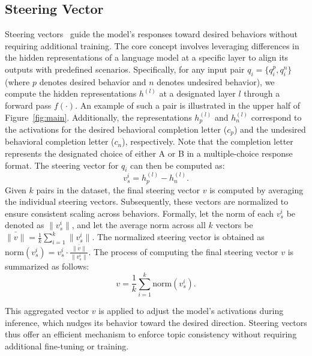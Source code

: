 \documentclass[11pt]{article}
\begin{document}
\subsection{Steering Vector}\label{steering_vector_concept}
Steering vectors~\cite{rimsky-etal-2024-steering} guide the model's responses toward desired behaviors without requiring additional training. The core concept involves leveraging differences in the hidden representations of a language model at a specific layer to align its outputs with predefined scenarios. Specifically, for any input pair \( q_i = \{q^p_i, q^n_i\} \) (where \( p \) denotes desired behavior and \( n \) denotes undesired behavior), we compute the hidden representations \( h^{(l)} \) at a designated layer \( l \) through a forward pass \( f(\cdot) \). An example of such a pair is illustrated in the upper half of Figure~\ref{fig:main}. Additionally, the representations \( h_p^{(l)} \) and \( h_n^{(l)} \) correspond to the activations for the desired behavioral completion letter (\( c_p \)) and the undesired behavioral completion letter (\( c_n \)), respectively. Note that the completion letter represents the designated choice of either A or B in a multiple-choice response format. The steering vector for \( q_i \) can then be computed as:
\[
v_s^i = h_p^{(l)} - h_n^{(l)}.
\]
Given \( k \) pairs in the dataset, the final steering vector \( v \) is computed by averaging the individual steering vectors. Subsequently, these vectors are normalized to ensure consistent scaling across behaviors. Formally, let the norm of each \( v_s^i \) be denoted as \( \|v_s^i\| \), and let the average norm across all \( k \) vectors be \( \bar{\|v\|} = \frac{1}{k} \sum_{i=1}^k \|v_s^i\| \). The normalized steering vector is obtained as \(\text{norm}(v_s^i) = v_s^i \cdot \frac{\bar{\|v\|}}{\|v_s^i\|}\). The process of computing the final steering vector \(v\) is summarized as follows:
\[
v =  \frac{1}{k} \sum_{i=1}^k \text{norm}\left(v_s^i \right).
\]

This aggregated vector \( v \) is applied to adjust the model's activations during inference, which nudges its behavior toward the desired direction. Steering vectors thus offer an efficient mechanism to enforce topic consistency without requiring additional fine-tuning or training.
\end{document}
